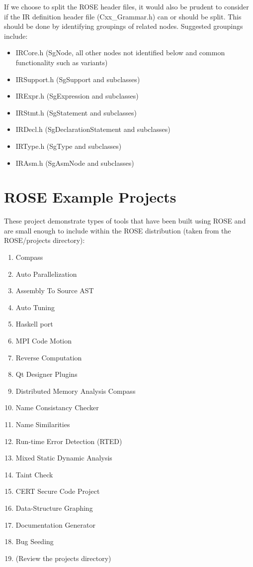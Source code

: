 If we choose to split the ROSE header files, it would also be prudent
to consider if the IR definition header file (Cxx\_Grammar.h) can
or should be split.  This should be done by identifying groupings of
related nodes.  Suggested groupings include:
\begin{itemize}
\item IRCore.h (SgNode, all other nodes not identified below and common functionality such as variants)
\item IRSupport.h (SgSupport and subclasses)
\item IRExpr.h (SgExpression and subclasses)
\item IRStmt.h (SgStatement and subclasses)
\item IRDecl.h (SgDeclarationStatement and subclasses)
\item IRType.h (SgType and subclasses)
\item IRAsm.h (SgAsmNode and subclasses)
\end{itemize}

\newpage


\section{ROSE Example Projects}
   These project demonstrate types of tools that have been built using ROSE and are 
small enough to include within the ROSE distribution (taken from the ROSE/projects
directory):
\begin{enumerate}
   \item Compass
   \item Auto Parallelization
   \item Assembly To Source AST
   \item Auto Tuning
   \item Haskell port
   \item MPI Code Motion
   \item Reverse Computation
   \item Qt Designer Plugins
   \item Distributed Memory Analysis Compass
   \item Name Consistancy Checker
   \item Name Similarities
   \item Run-time Error Detection (RTED)
   \item Mixed Static Dynamic Analysis
   \item Taint Check
   \item CERT Secure Code Project
   \item Data-Structure Graphing
   \item Documentation Generator
   \item Bug Seeding
   \item (Review the projects directory)
\end{enumerate}

